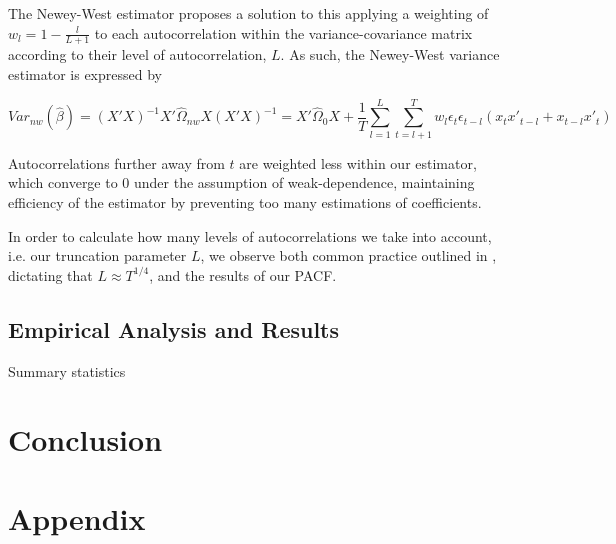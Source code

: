 \documentclass[12pt]{article}
\numberwithin{table}{section}   %
\begin{document}
The Newey-West estimator proposes a solution to this applying a weighting of $w_l=1-\frac{l}{L+1}$ to each autocorrelation within the variance-covariance matrix according to their level of autocorrelation, $L$. As such, the Newey-West variance estimator is expressed by

$$
\widehat{Var_{nw}(\hat{\beta})}=(X'X)^{-1}X'\hat{\Omega}_{nw}X(X'X)^{-1}=X'\hat{\Omega}_0X+\frac{1}{T}\sum^L_{l=1}\sum^T_{t=l+1}w_l\epsilon_t\epsilon_{t-l}(x_tx'_{t-l}+x_{t-l}x'_t)
$$

Autocorrelations further away from $t$ are weighted less within our estimator, which converge to 0 under the assumption of weak-dependence, maintaining efficiency of the estimator by preventing too many estimations of coefficients.

In order to calculate how many levels of autocorrelations we take into account, i.e. our truncation parameter $L$, we observe both common practice outlined in \cite{greene}, dictating that $L\approx{T^{1/4}}$, and the results of our PACF.


\subsection{Empirical Analysis and Results}

\begin{table}[!htbp]
    \caption{Summary statistics} \label{tab:table1}
    \centering
    
\end{table}



\break

\section{Conclusion}

\break

\section{Appendix}

\begin{singlespace}

    
    
    
    \break
    
    
\end{singlespace}
\end{document}
